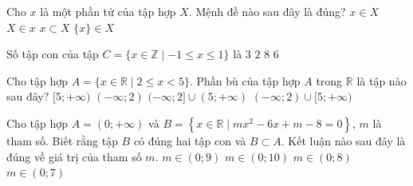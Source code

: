 \begin{ex}%
	Cho $x$ là một phần tử của tập hợp $X$. Mệnh đề nào sau đây là đúng?
	\choice
	{\True $x \in X$}
	{$X \in x$}
	{$x \subset X$}
	{$\{x\} \in X$}
\end{ex}
\begin{ex}%
	Số tập con của tập $C=\{x \in \mathbb{Z} \mid-1 \leqslant x \leqslant 1\}$ là
	\choice
	{$3$}
	{$2$}
	{\True $8$}
	{$6$}
\end{ex}
\begin{ex}%
	Cho tập hợp $A=\{x \in \mathbb{R} \mid 2 \leqslant x<5\}$. Phần bù của tập hợp $A$ trong $\mathbb{R}$ là tập nào sau đây?
	\choice
	{$[5 ;+\infty)$}
	{$(-\infty ; 2)$}
	{$(-\infty ; 2] \cup(5 ;+\infty)$}
	{\True $(-\infty ; 2) \cup[5 ;+\infty)$}
	\loigiai{
		Phần bù của tập hợp $A$ trong $\mathbb{R}$ là $\mathrm{C_{\mathbb{R}}A}=(-\infty ; 2) \cup[5 ;+\infty)$.
	}
\end{ex}
\begin{ex}%
	Cho tập hợp $A=(0 ;+\infty)$ và $B=\left\{x \in \mathbb{R} \mid m x^2-6 x+m-8=0\right\}$, $m$ là tham số. Biết rằng tập $B$ có đúng hai tập con và $B \subset A$. Kết luận nào sau đây là đúng về giá trị của tham số $m$.
	\choice
	{$m \in(0 ; 9)$ }
	{\True  $m \in(0 ; 10)$}
	{$m \in(0 ; 8)$}
	{$m \in(0 ; 7)$}	
\end{ex}
